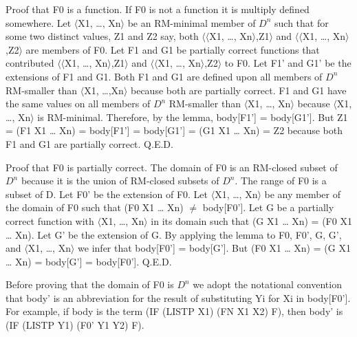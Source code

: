 \documentclass[11pt]{book}
\begin{document}
Proof that F0 is a function.  If F0 is not a function it is
multiply defined somewhere.  Let $\langle$X1, \ldots{}, Xn$\rangle$ be an RM-minimal member
of $D^{n}$ such that for some two distinct values, Z1 and Z2 say,
both $\langle \langle$X1, \ldots{}, Xn$\rangle$,Z1$\rangle$ and $\langle \langle$X1, \ldots{}, Xn$\rangle$,Z2$\rangle$ are members of F0.
Let F1 and G1 be partially correct functions that contributed
$\langle \langle$X1, \ldots{}, Xn$\rangle$,Z1$\rangle$ and $\langle \langle$X1, \ldots{}, Xn$\rangle$,Z2$\rangle$ to F0.  Let F1' and G1'
be the extensions of F1 and G1.  Both F1 and G1 are defined
upon all members of $D^{n}$ RM-smaller than $\langle$X1, \ldots{},Xn$\rangle$ because both
are partially correct.  F1 and G1 have the same values
on all members of $D^{n}$ RM-smaller than $\langle$X1, \ldots{}, Xn$\rangle$ because $\langle$X1, \ldots{}, Xn$\rangle$
is RM-minimal.  Therefore, by the lemma, body[F1'] = body[G1'].
But Z1 = (F1 X1 \ldots{} Xn) = body[F1'] = body[G1'] = (G1 X1 \ldots{} Xn) = Z2
because both F1 and G1 are partially correct.  Q.E.D.

Proof that F0 is partially correct.  The domain of F0 is an RM-closed
subset of $D^{n}$ because it is the union of RM-closed subsets of $D^{n}$.
The range of F0 is a subset of D.  Let F0' be the extension of F0.
Let $\langle$X1, \ldots{}, Xn$\rangle$ be any member of the domain of F0 such that
(F0 X1 \ldots{} Xn)  $\neq$  body[F0'].  Let G be a partially
correct function with $\langle$X1, \ldots{}, Xn$\rangle$ in its domain such that
(G X1 \ldots{} Xn) = (F0 X1 \ldots{} Xn).  Let G' be the extension of G.
By applying the lemma to F0, F0', G, G', and $\langle$X1, \ldots{}, Xn$\rangle$
we infer that body[F0'] = body[G'].  But (F0 X1 \ldots{} Xn) =
(G X1 \ldots{} Xn) = body[G'] = body[F0'].  Q.E.D.

Before proving that the domain of F0 is $D^{n}$ we adopt the notational
convention that body' is an abbreviation for the result of substituting
Yi for Xi in body[F0'].  For example, if body is the term
(IF (LISTP X1) (FN X1 X2) F), then body' is (IF (LISTP Y1) (F0' Y1 Y2) F).
\end{document}
